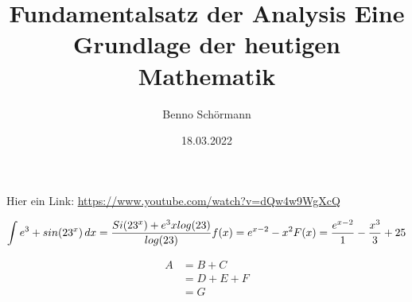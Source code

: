 \documentclass[12pt,a4paper,draft]{article}
\begin{document}
\title{Fundamentalsatz der Analysis\newline
\newline Eine Grundlage der heutigen Mathematik}
\author{Benno Schörmann}
\date{18.03.2022}

\maketitle
Hier ein Link: \url{https://www.youtube.com/watch?v=dQw4w9WgXcQ} \newline

\begin{equation}
	\int {e}^{3}+sin({23}^{x}) \,dx = \frac{Si({23}^{x})+{e}^{3}xlog(23)}{log(23)}\newline
	f(x)={e}^{x-2}-{x}^{2}\newline
	F(x)=\frac{{e}^{x-2}}{1}-\frac{{x}^{3}}{3}+25\newline
\end{equation}

\begin{equation}
	\begin{aligned}
		A & = B + C\\
		  & = D + E + F\\
		  & = G
	\end{aligned}
\end{equation}
\end{document}
